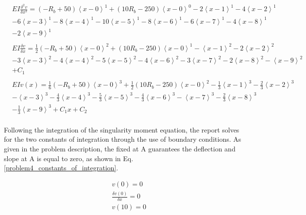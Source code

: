 \documentclass[a4paper]{article}
\begin{document}
\begin{equation}
    \begin{split}
& EI \frac{\delta^2 v}{\delta x^2} = \left(-R_b + 50\right)\left<x-0\right>^1 + \left(10R_b - 250\right)\left<x-0\right>^0 - 2\left<x-1\right>^1 - 4\left<x-2\right>^1\\
& - 6\left<x-3\right>^1   - 8\left<x-4\right>^1 - 10\left<x-5\right>^1 -  8\left<x-6\right>^1 - 6\left<x-7\right>^1  -  4\left<x-8\right>^1\\
&  - 2\left<x-9\right>^1  \\
& \\
& EI \frac{\delta v}{\delta x} = \frac{1}{2}\left(-R_b + 50\right)\left<x-0\right>^2 + \left(10R_b - 250\right)\left<x-0\right>^1 - \left<x-1\right>^2 - 2\left<x-2\right>^2  \\
& - 3\left<x-3\right>^2 - 4\left<x-4\right>^2 - 5\left<x-5\right>^2 -  4\left<x-6\right>^2 - 3\left<x-7\right>^2 -  2\left<x-8\right>^2 - \left<x-9\right>^2 \\
& + C_1 \\
& \\
& EI v(x) = \frac{1}{6}\left(-R_b + 50\right)\left<x-0\right>^3 + \frac{1}{2}\left(10R_b - 250\right)\left<x-0\right>^2 - \frac{1}{3}\left<x-1\right>^3 - \frac{2}{3}\left<x-2\right>^3 \\
& - \left<x-3\right>^3 - \frac{4}{3}\left<x-4\right>^3 - \frac{5}{3}\left<x-5\right>^3  -  \frac{4}{3}\left<x-6\right>^3 - \left<x-7\right>^3 -  \frac{2}{3}\left<x-8\right>^3  \\
& - \frac{1}{3}\left<x-9\right>^3  + C_1 x + C_2 \\
    \end{split}
\label{problem4_equations}
\end{equation}

Following the integration of the singularity moment equation, the report solves for the two constants of integration through the use of boundary conditions. As given in the problem description, the fixed at A guarantees the deflection and slope at A is equal to zero, as shown in Eq. \ref{problem4_constants_of_integration}.

\begin{equation}
\begin{split}
	& v(0) = 0 \\
	& \frac{\delta v(0)}{\delta x} = 0 \\
	& v(10) = 0 \\
\end{split}
\label{problem4_constants_of_integration}
\end{equation}
\end{document}
